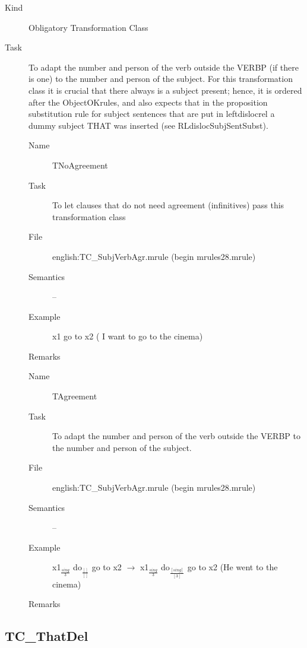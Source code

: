 \begin{description}
\item[Kind] Obligatory Transformation Class
\item[Task] To adapt the number and person of the verb outside the VERBP (if 
there is one) to the number and person of the subject. For this transformation 
class it is crucial that there always is a subject present; hence, it is 
ordered after the ObjectOKrules, and also expects that in the proposition 
substitution rule for subject sentences that are put in leftdislocrel a dummy 
subject THAT was inserted (see RLdislocSubjSentSubst).

\vspace{1 cm}
\begin{description}
\item[Name] TNoAgreement
\item[Task] To let clauses that do not need agreement (infinitives) pass this 
transformation class 
\item[File] english:TC\_SubjVerbAgr.mrule (begin mrules28.mrule)
\item[Semantics] --
\item[Example] x1 go to x2 ( I want to go to the cinema)
\item[Remarks] 
\end{description}

\vspace{1 cm}
\begin{description}
\item[Name] TAgreement
\item[Task] To adapt the number and person of the verb outside the VERBP 
to the number and person of the subject.
\item[File] english:TC\_SubjVerbAgr.mrule (begin mrules28.mrule)
\item[Semantics] --
\item[Example] x1$_{\frac{sing}{3}}$ do$_{\frac{[]}{[]}}$ go to x2
$\rightarrow$ x1$_{\frac{sing}{3}}$ do$_{\frac{[sing]}{[3]}}$ go to x2
(He went to the cinema)
\item[Remarks] 
\end{description}

\end{description}

\newpage
\subsection{TC\_ThatDel}

